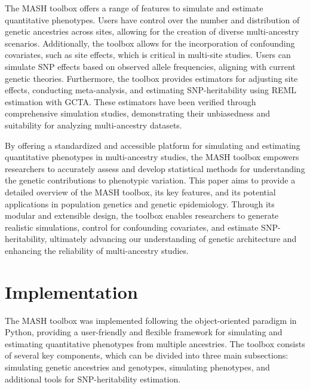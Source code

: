 \documentclass[sn-nature]{sn-jnl}%
\begin{document}
The MASH toolbox offers a range of features to simulate and estimate quantitative phenotypes. Users have control over the number and distribution of genetic ancestries across sites, allowing for the creation of diverse multi-ancestry scenarios. Additionally, the toolbox allows for the incorporation of confounding covariates, such as site effects, which is critical in multi-site studies. Users can simulate SNP effects based on observed allele frequencies, aligning with current genetic theories. Furthermore, the toolbox provides estimators for adjusting site effects, conducting meta-analysis, and estimating SNP-heritability using REML estimation with GCTA. These estimators have been verified through comprehensive simulation studies, demonstrating their unbiasedness and suitability for analyzing multi-ancestry datasets.

By offering a standardized and accessible platform for simulating and estimating quantitative phenotypes in multi-ancestry studies, the MASH toolbox empowers researchers to accurately assess and develop statistical methods for understanding the genetic contributions to phenotypic variation. This paper aims to provide a detailed overview of the MASH toolbox, its key features, and its potential applications in population genetics and genetic epidemiology. Through its modular and extensible design, the toolbox enables researchers to generate realistic simulations, control for confounding covariates, and estimate SNP-heritability, ultimately advancing our understanding of genetic architecture and enhancing the reliability of multi-ancestry studies.



\section{Implementation}\label{sec:implementation}
The MASH toolbox was implemented following the object-oriented paradigm in Python, providing a user-friendly and flexible framework for simulating and estimating quantitative phenotypes from multiple ancestries. The toolbox consists of several key components, which can be divided into three main subsections: simulating genetic ancestries and genotypes, simulating phenotypes, and additional tools for SNP-heritability estimation.
\end{document}
